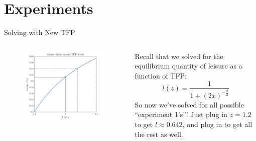 \documentclass[11pt,aspectratio=43]{beamer}
\theoremstyle{definition}
\begin{document}
\section{Experiments}
\label{sec:Experiments}

\begin{frame}{Solving with New TFP}
\label{slide:Solving_with_New_TFP}
    \begin{columns}
        \begin{column}{0.5\textwidth}
            \begin{figure}
                \includegraphics[width=\textwidth]{./figures/TFPsolveSPP.png}
            \end{figure}
        \end{column}
        \begin{column}{0.5\textwidth}
            Recall that we solved for the equilibrium quantity of leisure as a function of TFP:
            \begin{equation}
            \label{eq:leisure}
                l( z ) = \frac{1}{1 + ( 2x )^{-\frac{2}{3}}}
            \end{equation}
            So now we’ve solved for all possible ``experiment 1’s''! Just plug in $ z = 1.2 $ to get $ l \approx 0.642 $, and plug in to get all the rest as well.
        \end{column}
    \end{columns}
\end{frame}
\end{document}
